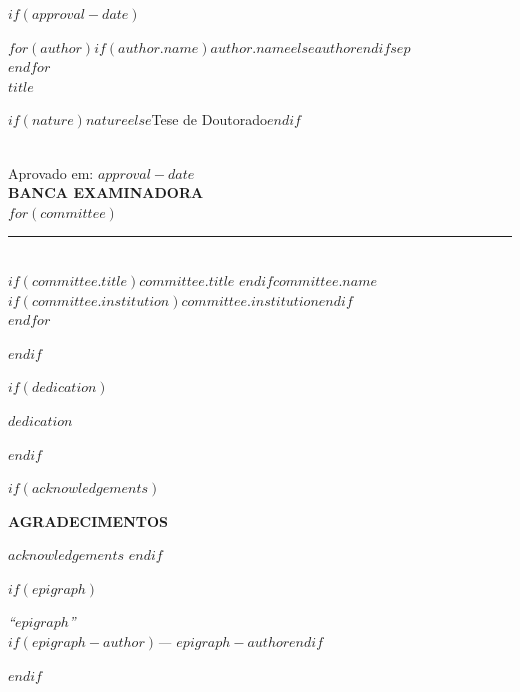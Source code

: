 \documentclass[
  12pt,
  oneside,
  a4paper,
  chapter=TITLE,
  english,
  portuguese
]{abntex2}
\renewcommand{\ABNTEXchapterfont}{\bfseries}
\begin{document}
$if(approval-date)$
\newpage
\thispagestyle{empty}
\begin{center}
  {\ABNTEXchapterfont\bfseries\large
    $for(author)$$if(author.name)$\MakeUppercase{$author.name$}$else$\MakeUppercase{$author$}$endif$$sep$\\$endfor$
  }\\[1cm]
  {\ABNTEXchapterfont\bfseries\large \MakeUppercase{$title$}}\\[1cm]
  \hspace*{8cm}\parbox{8cm}{\normalsize\normalfont
    $if(nature)$$nature$$else$Tese de Doutorado$endif$
  }\\[1cm]
  Aprovado em: $approval-date$\\[2cm]
  {\bfseries BANCA EXAMINADORA}\\[1.5cm]
  $for(committee)$
  \rule{8cm}{0.4pt}\\
  $if(committee.title)$$committee.title$ $endif$$committee.name$\\
  $if(committee.institution)$$committee.institution$$endif$\\[1.5cm]
  $endfor$
\end{center}
$endif$

$if(dedication)$
\newpage
\thispagestyle{empty}
\vspace*{\fill}
\hspace*{8cm}\parbox{8cm}{\normalfont\itshape $dedication$}
$endif$

$if(acknowledgements)$
\newpage
\thispagestyle{empty}
\begin{center}{\ABNTEXchapterfont\bfseries\normalsize AGRADECIMENTOS}\end{center}
\vspace{\onelineskip}
$acknowledgements$
\clearpage
$endif$

$if(epigraph)$
\newpage
\thispagestyle{empty}
\vspace*{\fill}
\hspace*{8cm}\parbox{8cm}{\normalfont\itshape
  ``$epigraph$''\\
  $if(epigraph-author)$\hfill --- $epigraph-author$$endif$
}
$endif$
\end{document}
